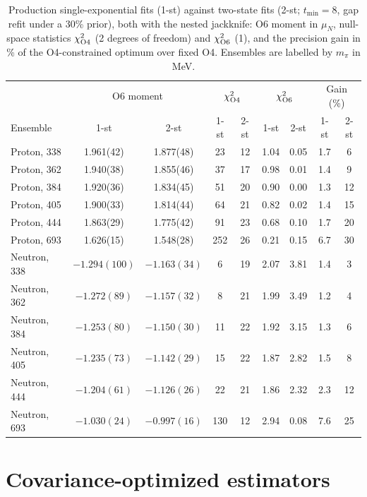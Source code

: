 \documentclass[aps,prd,preprint,nofootinbib,floatfix]{revtex4-2}
\begin{document}
\begin{table}[t]
\caption{Production single-exponential fits (1-st) against two-state fits (2-st; $t_{\min}=8$, gap refit under a 30\% prior), both with the nested jackknife: O6 moment in $\mu_N$, null-space statistics $\chi^2_{\rm O4}$ (2 degrees of freedom) and $\chi^2_{\rm O6}$ (1), and the precision gain in \% of the O4-constrained optimum over fixed O4. Ensembles are labelled by $m_\pi$ in MeV.}
\label{tab:twostate}
\centering
\setlength{\tabcolsep}{6pt}\begin{tabular}{lcccccccc}
\toprule
 & \multicolumn{2}{c}{O6 moment} & \multicolumn{2}{c}{$\chi^2_{\rm O4}$} & \multicolumn{2}{c}{$\chi^2_{\rm O6}$} & \multicolumn{2}{c}{Gain (\%)}\\
Ensemble & 1-st & 2-st & 1-st & 2-st & 1-st & 2-st & 1-st & 2-st\\
\midrule
Proton, 338 & 1.961(42) & 1.877(48) & 23 & 12 & 1.04 & 0.05 & 1.7 & 6\\
Proton, 362 & 1.940(38) & 1.855(46) & 37 & 17 & 0.98 & 0.01 & 1.4 & 9\\
Proton, 384 & 1.920(36) & 1.834(45) & 51 & 20 & 0.90 & 0.00 & 1.3 & 12\\
Proton, 405 & 1.900(33) & 1.814(44) & 64 & 21 & 0.82 & 0.02 & 1.4 & 15\\
Proton, 444 & 1.863(29) & 1.775(42) & 91 & 23 & 0.68 & 0.10 & 1.7 & 20\\
Proton, 693 & 1.626(15) & 1.548(28) & 252 & 26 & 0.21 & 0.15 & 6.7 & 30\\
\midrule
Neutron, 338 & $-1.294(100)$ & $-1.163(34)$ & 6 & 19 & 2.07 & 3.81 & 1.4 & 3\\
Neutron, 362 & $-1.272(89)$ & $-1.157(32)$ & 8 & 21 & 1.99 & 3.49 & 1.2 & 4\\
Neutron, 384 & $-1.253(80)$ & $-1.150(30)$ & 11 & 22 & 1.92 & 3.15 & 1.3 & 6\\
Neutron, 405 & $-1.235(73)$ & $-1.142(29)$ & 15 & 22 & 1.87 & 2.82 & 1.5 & 8\\
Neutron, 444 & $-1.204(61)$ & $-1.126(26)$ & 22 & 21 & 1.86 & 2.32 & 2.3 & 12\\
Neutron, 693 & $-1.030(24)$ & $-0.997(16)$ & 130 & 12 & 2.94 & 0.08 & 7.6 & 25\\
\bottomrule
\end{tabular}
\end{table}

\section{Covariance-optimized estimators}
\label{sec:blue}
\end{document}
